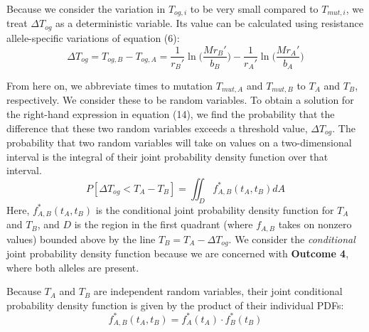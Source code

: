 \documentclass{article}
\begin{document}
Because we consider the variation in $T_{og,i}$ to be very small compared to $T_{mut,i}$, we treat $\Delta T_{og}$ as a deterministic variable.  Its value can be calculated using resistance allele-specific variations of equation (6):
\begin{equation}
\Delta T_{og} = T_{og,B}-T_{og,A} = \frac{1}{r_B'}\ln\Big(\frac{Mr_B'}{b_B}\Big) - \frac{1}{r_A'}\ln\Big(\frac{Mr_A'}{b_A}\Big)
\end{equation}

From here on, we abbreviate times to mutation $T_{mut,A}$ and $T_{mut,B}$ to $T_A$ and $T_B$, respectively.  We consider these to be random variables.  To obtain a solution for the right-hand expression in equation (14), we find the probability that the difference that these two random variables exceeds a threshold value, $\Delta T_{og}$.  The probability that two random variables will take on values on a two-dimensional interval is the integral of their joint probability density function over that interval.
\begin{equation}
P[\Delta T_{og} < T_{A} - T_{B}] = \iint_D f_{A,B}^*(t_{A},t_{B})dA
\end{equation}
Here, $f_{A,B}^*(t_{A},t_{B})$ is the conditional joint probability density function for $T_{A}$ and $T_{B}$, and $D$ is the region in the first quadrant (where $f_{A,B}$ takes on nonzero values) bounded above by the line $T_{B} = T_{A}-\Delta T_{og}$.  We consider the \textit{conditional} joint probability density function because we are concerned with \textbf{Outcome 4}, where both alleles are present.

Because $T_{A}$ and $T_{B}$ are independent random variables, their joint conditional probability density function is given by the product of their individual PDFs:
\begin{equation}
f_{A,B}^*(t_{A},t_{B}) = f_{A}^*(t_{A}) \cdot  f_B^*(t_{B})
\end{equation}
\end{document}
